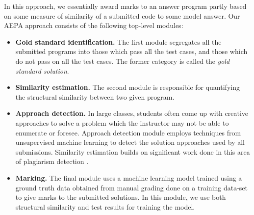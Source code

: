 \documentclass[12pt]{article}
\begin{document}
In this approach, we essentially award marks to an answer program partly based on some measure of similarity of a submitted code to some model answer. Our AEPA approach consists of the following top-level modules:
\begin{itemize}
\item \textbf{Gold standard identification.} The first module segregates all the submitted programs into those which pass all the test cases, and those which do not pass on all the test cases. The former category is called the \emph{gold standard solution}.

\item \textbf{Similarity estimation.} The second module is responsible for quantifying the structural similarity between two given program. 
\item \textbf{Approach detection.} In large classes, students often come up with creative approaches to solve a problem which the instructor may not be able to enumerate or foresee. Approach detection module employs techniques from unsupervised machine learning to detect the solution approaches used by all submissions. Similarity estimation builds on significant work done in this area of plagiarism detection \cite{Liu,Schleimer,Sajnani}.


\item \textbf{Marking.} The final module uses a machine learning model trained using a ground truth data obtained from manual grading done on a training data-set to give marks to the submitted solutions. In this module, we use both structural similarity and test results for training the model.
\end{itemize} 
\end{document}
